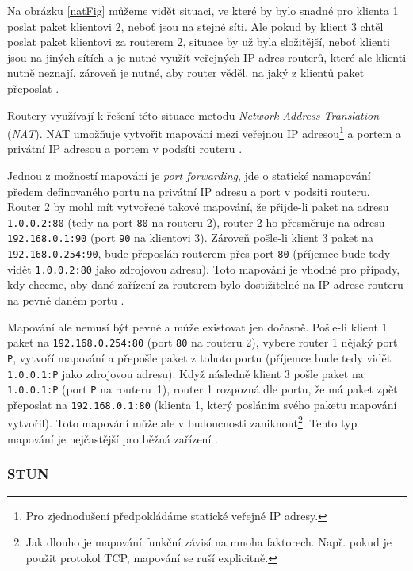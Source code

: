 Na obrázku \ref{natFig} můžeme vidět situaci, ve které by bylo snadné pro
klienta 1 poslat paket klientovi 2, neboť jsou na stejné síti. Ale pokud by
klient 3 chtěl poslat paket klientovi za routerem 2, situace by už byla
složitější, neboť klienti jsou na jiných sítích a je nutné využít veřejných IP
adres routerů, které ale klienti nutně neznají, zároveň je nutné, aby router
věděl, na jaký z klientů paket přeposlat \cite{WebRTCForTheCurious}.

Routery využívají k řešení této situace metodu \textit{Network Address
Translation} (\textit{NAT}). NAT umožňuje vytvořit mapování mezi veřejnou IP
adresou\footnote{Pro zjednodušení předpokládáme statické veřejné IP adresy.} a
portem a privátní IP adresou a portem v podsíti routeru
\cite{WebRTCForTheCurious}.

Jednou z možností mapování je \textit{port forwarding}, jde o statické
namapování předem definovaného portu na privátní IP adresu a port v podsiti
routeru. Router 2 by mohl mít vytvořené takové mapování, že přijde-li paket na
adresu \texttt{1.0.0.2:80} (tedy na port \texttt{80} na
routeru 2), router 2 ho přesměruje na adresu \texttt{192.168.0.1:90}
(port \texttt{90} na klientovi 3). Zároveň pošle-li klient 3 paket na
\texttt{192.168.0.254:90}, bude přeposlán routerem přes port
\texttt{80} (příjemce bude tedy vidět \texttt{1.0.0.2:80}
jako zdrojovou adresu). Toto mapování je vhodné pro případy, kdy chceme, aby
dané zařízení za routerem bylo dostižitelné na IP adrese routeru na pevně daném
portu \cite{G2-WhatIsPortForwarding}.

Mapování ale nemusí být pevné a může existovat jen dočasně. Pošle-li klient 1
paket na \texttt{192.168.0.254:80} (port \texttt{80} na
routeru 2), vybere router 1 nějaký port \texttt{P}, vytvoří mapování a
přepošle paket z tohoto portu (příjemce bude tedy vidět
\texttt{1.0.0.1:P} jako zdrojovou adresu). Když následně klient 3
pošle paket na \texttt{1.0.0.1:P} (port \texttt{P} na
routeru~1), router 1 rozpozná dle portu, že má paket zpět přeposlat na
\texttt{192.168.0.1:80} (klienta 1, který posláním svého paketu
mapování vytvořil). Toto mapování může ale v budoucnosti zaniknout\footnote{Jak
dlouho je mapování funkční závisí na mnoha faktorech. Např. pokud je použit
protokol TCP, mapování se ruší explicitně.}. Tento typ mapování je nejčastější
pro běžná zařízení \cite{WebRTCForTheCurious}.

\subsubsection{STUN}

